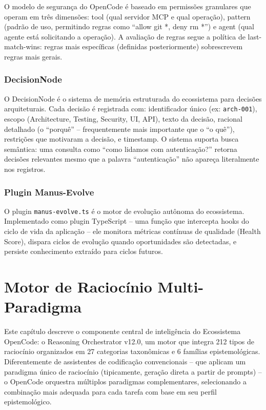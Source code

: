 \documentclass[12pt,a4paper,sumario=tradicional,openany]{abntex2}
\begin{document}
O modelo de segurança do OpenCode é baseado em permissões granulares que operam em três dimensões: tool (qual servidor MCP e qual operação), pattern (padrão de uso, permitindo regras como ``allow git *, deny rm *'') e agent (qual agente está solicitando a operação). A avaliação de regras segue a política de last-match-wins: regras mais específicas (definidas posteriormente) sobrescrevem regras mais gerais.

\subsection{DecisionNode}

O DecisionNode é o sistema de memória estruturada do ecossistema para decisões arquiteturais. Cada decisão é registrada com: identificador único (ex: \texttt{arch-001}), escopo (Architecture, Testing, Security, UI, API), texto da decisão, racional detalhado (o ``porquê'' -- frequentemente mais importante que o ``o quê''), restrições que motivaram a decisão, e timestamp. O sistema suporta busca semântica: uma consulta como ``como lidamos com autenticação?'' retorna decisões relevantes mesmo que a palavra ``autenticação'' não apareça literalmente nos registros.

\subsection{Plugin Manus-Evolve}

O plugin \texttt{manus-evolve.ts} é o motor de evolução autônoma do ecossistema. Implementado como plugin TypeScript -- uma função que intercepta hooks do ciclo de vida da aplicação -- ele monitora métricas contínuas de qualidade (Health Score), dispara ciclos de evolução quando oportunidades são detectadas, e persiste conhecimento extraído para ciclos futuros.

\chapter{Motor de Raciocínio Multi-Paradigma}

Este capítulo descreve o componente central de inteligência do Ecossistema OpenCode: o Reasoning Orchestrator v12.0, um motor que integra 212 tipos de raciocínio organizados em 27 categorias taxonômicas e 6 famílias epistemológicas. Diferentemente de assistentes de codificação convencionais -- que aplicam um paradigma único de raciocínio (tipicamente, geração direta a partir de prompts) -- o OpenCode orquestra múltiplos paradigmas complementares, selecionando a combinação mais adequada para cada tarefa com base em seu perfil epistemológico.
\end{document}
